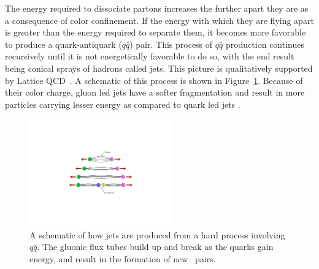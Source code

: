 
The energy required to dissociate partons increases the further apart they are as a consequence of color confinement.
If the energy with which they are flying apart is greater than the energy required to separate them, it becomes more favorable to produce a quark-antiquark ($q\bar{q}$) pair.
This process of $q \bar{q}$ production continues recursively until it is not energetically favorable to do so, with the end result being conical sprays of hadrons called jets.
This picture is qualitatively supported by Lattice QCD~\cite{PhysRevD.71.114513}. 
A schematic of this process is shown in Figure~\ref{fig:qqbar_to_jet}.
Because of their color charge, gluon led jets have a softer fragmentation and result in more particles carrying lesser energy as compared to quark led jets \cite{Abbiendi:1999pi}.

\begin{figure}[htbp]
\begin{center}
\includegraphics[width=0.55\textwidth]{figures/theory/qqbar_to_jet}
\caption{A schematic of how jets are produced from a hard process involving $q \bar{q}$. The gluonic flux tubes build up and break as the quarks gain energy, and result in the formation of new \qqbar\ pairs.}
\label{fig:qqbar_to_jet}
\end{center}
\end{figure}

